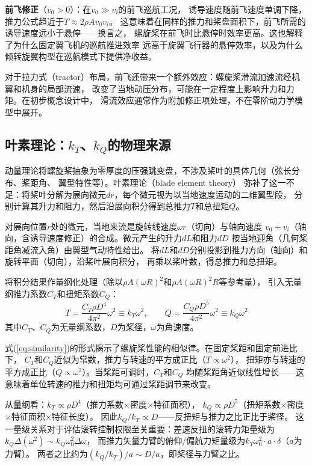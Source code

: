 \textbf{前飞修正}（$v_0 > 0$）：在$v_0 \gg v_i$的前飞巡航工况，
诱导速度随前飞速度单调下降，推力公式趋近于$T \approx 2\rho A v_0 v_i$。
这意味着在同样的推力和桨盘面积下，前飞所需的诱导速度远小于悬停——换言之，
螺旋桨在前飞时比悬停时效率更高。这也解释了为什么固定翼飞机的巡航推进效率
远高于旋翼飞行器的悬停效率，以及为什么倾转旋翼构型在巡航模式下提供净收益。

对于拉力式（tractor）布局，前飞还带来一个额外效应：螺旋桨滑流加速流经机翼和机身的局部流速，
改变了当地动压分布，可能在一定程度上影响升力和力矩。在初步概念设计中，
滑流效应通常作为附加修正项处理，不在零阶动力学模型中展开。

\subsection{叶素理论：$k_T$、$k_Q$的物理来源}

动量理论将螺旋桨抽象为零厚度的压强跳变盘，不涉及桨叶的具体几何（弦长分布、桨距角、
翼型特性等）。叶素理论（blade element theory）\cite{mccormick1995aerodynamics}
弥补了这一不足：将桨叶分解为展向微元$dr$，每个微元视为以当地速度运动的二维翼型段，
分别计算其升力和阻力，然后沿展向积分得到总推力$T$和总扭矩$Q$。

对展向位置$r$处的微元，当地来流是旋转线速度$\omega r$（切向）与轴向速度
$v_0+v_i$（轴向，含诱导速度修正）的合成。微元产生的升力$dL$和阻力$dD$
按当地迎角（几何桨距角减流入角）由翼型气动特性给出。
将$dL$和$dD$分别投影到推力方向（轴向）和旋转平面（切向），沿桨叶展向积分，
再乘以桨叶数，得总推力和总扭矩。

将积分结果作量纲化处理（除以$\rho A (\omega R)^2$和$\rho A (\omega R)^2 R$等参考量），
引入无量纲推力系数$C_T$和扭矩系数$C_Q$：
\begin{equation}
    T = \frac{C_T \rho D^4}{4\pi^2} \omega^2 \equiv k_T \omega^2, \qquad
    Q = \frac{C_Q \rho D^5}{4\pi^2} \omega^2 \equiv k_Q \omega^2
    \label{eq:similarity}
\end{equation}
其中$C_T$、$C_Q$为无量纲系数，$D$为桨径，$\omega$为角速度。

式(\ref{eq:similarity})的形式揭示了螺旋桨性能的相似律。在固定桨距和固定前进比下，
$C_T$和$C_Q$近似为常数，推力与转速的平方成正比（$T \propto \omega^2$），
扭矩亦与转速的平方成正比（$Q \propto \omega^2$）。当桨距可调时，$C_T$和$C_Q$
均随桨距角近似线性增长——这意味着单位转速的推力和扭矩均可通过桨距调节来改变。

从量纲看：$k_T \propto \rho D^4$（推力系数$\times$密度$\times$特征面积），
$k_Q \propto \rho D^5$（扭矩系数$\times$密度$\times$特征面积$\times$特征长度）。
因此$k_Q / k_T \propto D$——反扭矩与推力之比正比于桨径。
这一量级关系对于评估滚转控制权限至关重要：差速反扭的滚转力矩量级为$k_Q \Delta(\omega^2) \sim k_Q \omega_0^2 \Delta\omega$，
而推力矢量力臂的俯仰/偏航力矩量级为$k_T \omega_0^2 \cdot a \cdot \delta$（$a$为力臂）。
两者之比约为$(k_Q / k_T) / a \sim D / a$，即桨径与力臂之比。

